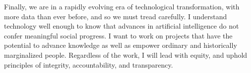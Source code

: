 \documentclass[11pt, a4paper]{maedbh-cv}
\begin{document}
\begin{cvletter}
Finally, we are in a rapidly evolving era of technological transformation, with more data than ever before, and so we must tread carefully. I understand technology well enough to know that advances in artificial intelligence do not confer meaningful social progress. I want to work on projects that have the potential to advance knowledge as well as empower ordinary and historically marginalized people. Regardless of the work, I will lead with equity, and uphold principles of integrity, accountability, and transparency. 

\end{cvletter}


\makeletterclosing
\end{document}
